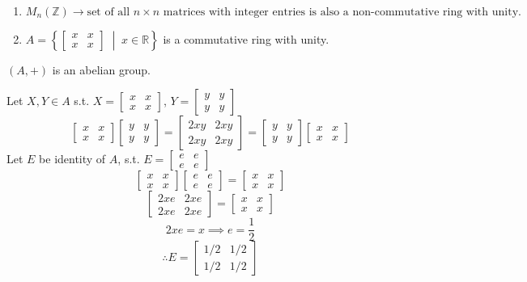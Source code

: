 \documentclass[11pt]{article}
\begin{document}
\begin{enumerate}[resume]
    \item $M_n(\mathbb{Z}) \to \text{set of all } n \times n \text{ matrices with integer entries is also a non-commutative ring with unity.}$
    \item $A = \left\{ \begin{bmatrix} x & x \\ x & x \end{bmatrix} \;\middle|\; x \in \mathbb{R} \right\}$ is a commutative ring with unity.
\end{enumerate}

\noindent $(A, +)$ is an abelian group.

\noindent Let $X, Y \in A$ s.t. $X = \begin{bmatrix} x & x \\ x & x \end{bmatrix}$, $Y = \begin{bmatrix} y & y \\ y & y \end{bmatrix}$
\[
\begin{bmatrix} x & x \\ x & x \end{bmatrix} \begin{bmatrix} y & y \\ y & y \end{bmatrix} = \begin{bmatrix} 2xy & 2xy \\ 2xy & 2xy \end{bmatrix} = \begin{bmatrix} y & y \\ y & y \end{bmatrix} \begin{bmatrix} x & x \\ x & x \end{bmatrix}
\]
Let $E$ be identity of $A$, s.t. $E = \begin{bmatrix} e & e \\ e & e \end{bmatrix}$
\[
\begin{bmatrix} x & x \\ x & x \end{bmatrix} \begin{bmatrix} e & e \\ e & e \end{bmatrix} = \begin{bmatrix} x & x \\ x & x \end{bmatrix}
\]
\[
\begin{bmatrix} 2xe & 2xe \\ 2xe & 2xe \end{bmatrix} = \begin{bmatrix} x & x \\ x & x \end{bmatrix}
\]
\[
2xe = x \implies e = \frac{1}{2}
\]
\[
\therefore E = \begin{bmatrix} 1/2 & 1/2 \\ 1/2 & 1/2 \end{bmatrix}
\]
\end{document}
